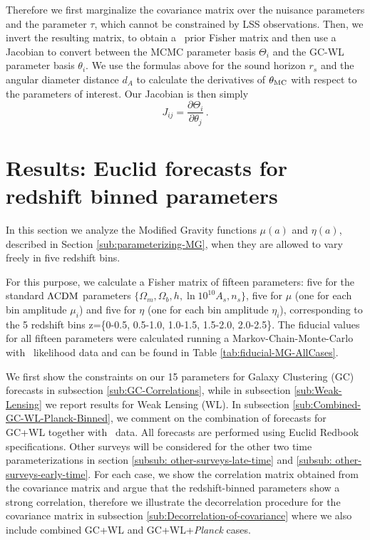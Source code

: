 Therefore we first marginalize the covariance matrix over the nuisance
parameters and the parameter $\tau$, which cannot be constrained
by LSS observations. Then, we invert the resulting matrix, to obtain a \planck\
prior Fisher matrix and then use a Jacobian to convert between the
MCMC parameter basis $\Theta_{i}$ and the GC-WL parameter basis $\theta_{i}$.
We use the formulas above for the sound horizon $r_{s}$ and the angular
diameter distance $d_{A}$ to calculate the derivatives of $\theta_{\rm MC}$
with respect to the parameters of interest. Our Jacobian is then simply
\begin{equation}
J_{ij}=\frac{\partial\Theta_{i}}{\partial\theta_{j}} \, .
\end{equation}

\section{\label{sec:Results:-Redshift-Binned}Results: Euclid forecasts for redshift binned parameters}
In this section we analyze the Modified Gravity functions $\mu(a)$ and $\eta(a)$,
described in Section \ref{sub:parameterizing-MG}, when they are allowed
to vary freely in five redshift bins.

For this purpose, we calculate a Fisher matrix of fifteen parameters:
five for the standard $\Lambda\mathrm{CDM}$ parameters $\{\Omega_{m},\Omega_{b},h,\ln10^{10}A_{s},n_{s}\}$,
five for $\mu$ (one
for each bin amplitude $\mu_{i}$) and five for $\eta$ (one for each
bin amplitude $\eta_{i}$), corresponding to the 5 redshift bins z=\{0-0.5, 0.5-1.0, 1.0-1.5, 1.5-2.0, 2.0-2.5\}. 
The fiducial values for all fifteen parameters
were calculated running a Markov-Chain-Monte-Carlo with \planck\ likelihood
data and can be found in Table \ref{tab:fiducial-MG-AllCases}.

We first show the constraints on our 15 parameters for Galaxy Clustering (GC) forecasts in subsection \ref{sub:GC-Correlations},
while in subsection \ref{sub:Weak-Lensing} we report results for Weak Lensing (WL). In subsection \ref{sub:Combined-GC-WL-Planck-Binned}, we
comment on the combination of forecasts for GC+WL together with \planck\ data.
All forecasts are performed using Euclid Redbook specifications. 
Other surveys 
will be considered for the other two time parameterizations in section \ref{subsub: other-surveys-late-time} and 
\ref{subsub: other-surveys-early-time}. 
For each case, we show the correlation matrix obtained from the covariance matrix and argue that 
the redshift-binned
parameters show a strong correlation, therefore we illustrate the decorrelation
procedure for the covariance matrix in subsection \ref{sub:Decorrelation-of-covariance}
where we also include combined GC+WL and GC+WL+{\it Planck} cases.



